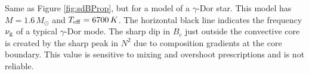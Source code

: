 \label{fig:GdorProp}
Same as Figure \ref{fig:sdBProp}, but for a model of a $\gamma$-Dor star. This model has $M=1.6 \, M_\odot$ and $T_{\rm eff} = 6700 \, K$. The horizontal black line indicates the frequency $\nu_{\rm g}$ of a typical $\gamma$-Dor mode. The sharp dip in $B_c$ just outside the convective core is created by the sharp peak in $N^2$ due to composition gradients at the core boundary. This value is sensitive to mixing and overshoot prescriptions and is not reliable. 